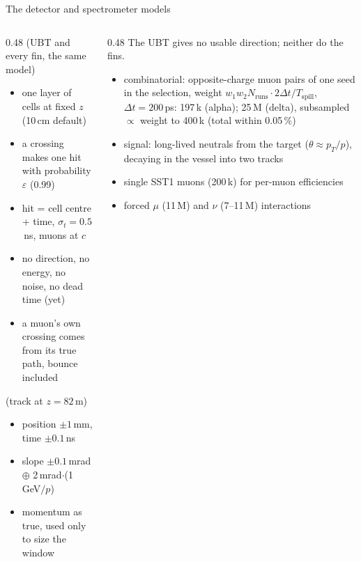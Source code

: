 \documentclass[aspectratio=169,10pt]{beamer}
\begin{document}
\begin{frame}{The detector and spectrometer models}
  \begin{columns}[T]
    \begin{column}{0.48\textwidth}\footnotesize
       (UBT and every fin, the same model)
      \begin{itemize}\scriptsize
        \item one layer of cells at fixed $z$ (10\,cm default)
        \item a crossing makes one hit with probability $\varepsilon$ (0.99)
        \item hit = cell centre + time, $\sigma_t = 0.5$\,ns, muons at $c$
        \item no direction, no energy, no noise, no dead time (yet)
        \item a muon's own crossing comes from its true path, bounce included
      \end{itemize}
      \vspace{1mm}
       (track at $z = 82$\,m)
      \begin{itemize}\footnotesize
        \item position $\pm1$\,mm, time $\pm0.1$\,ns
        \item slope $\pm0.1$\,mrad $\oplus$ 2\,mrad$\cdot$(1\,GeV$/p$)
        \item momentum as true, used only to size the window
      \end{itemize}
    \end{column}
    \begin{column}{0.48\textwidth}\footnotesize
       The UBT gives no usable direction; neither do the fins.\\[1.5mm]
      \begin{itemize}\scriptsize
        \item combinatorial: opposite-charge muon pairs of one seed in the selection, weight $w_1 w_2 N_\text{runs}\cdot 2\Delta t/T_\text{spill}$, $\Delta t = 200$\,ps: 197\,k (alpha); 25\,M (delta), subsampled $\propto$ weight to 400\,k (total within 0.05\,\%)
        \item signal: long-lived neutrals from the target ($\theta\approx p_T/p$), decaying in the vessel into two tracks
        \item single SST1 muons (200\,k) for per-muon efficiencies
        \item forced $\mu$ (11\,M) and $\nu$ (7--11\,M) interactions
      \end{itemize}
    \end{column}
  \end{columns}
\end{frame}
\end{document}
